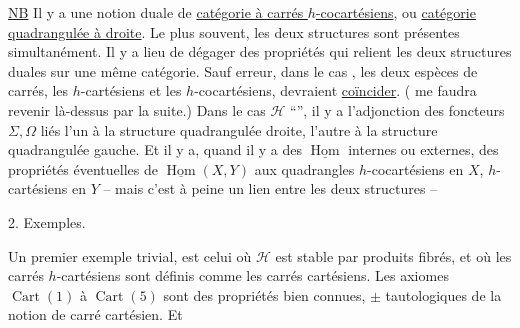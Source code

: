 \uline{NB} Il y a une notion duale de \uline{catégorie à carrés $h$-cocartésiens}, ou \uline{catégorie quadrangulée à droite}. Le plus souvent, les deux structures sont présentes simultanément. Il y a lieu de dégager des propriétés qui relient les deux structures duales sur une même catégorie.  Sauf erreur, dans le cas  , les deux espèces de carrés, les $h$-cartésiens et les $h$-cocartésiens, devraient \uline{coïncider}. ( me faudra revenir là-dessus par la suite.) Dans le cas $\mathscr H$ ``'', il y a l'adjonction des foncteurs $\Sigma,\Omega$ liés l'un à la structure quadrangulée droite, l'autre à la structure quadrangulée gauche. Et il y a, quand il y a des $\underline{\operatorname{Hom}}$ internes ou externes, des propriétés éventuelles de $\underline{\operatorname{Hom}}(X,Y)$  aux quadrangles $h$-cocartésiens en $X$, $h$-cartésiens en $Y$ -- mais c'est à peine un lien entre les deux structures --

2. Exemples.

Un premier exemple trivial, est celui où $\mathscr H$ est stable par produits fibrés, et où les carrés $h$-cartésiens sont définis comme les carrés cartésiens. Les axiomes $\operatorname{Cart}(1)$ à $\operatorname{Cart}(5)$ sont des propriétés bien connues, $\pm$ tautologiques de la notion de carré cartésien. Et
